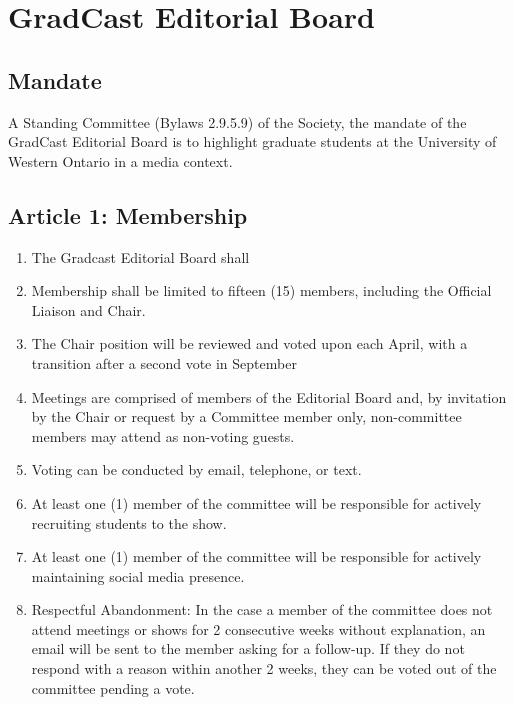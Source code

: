 \section{GradCast Editorial Board}

\subsection{Mandate}
A Standing Committee (Bylaws 2.9.5.9) of the Society, the mandate of the GradCast Editorial Board is to highlight graduate students at the University of Western Ontario in a media context.
\subsection{Article 1: Membership}
\begin{enumerate}
\item The Gradcast Editorial Board shall 
\item Membership shall be limited to fifteen (15) members, including the Official Liaison and Chair.
\item The Chair position will be reviewed and voted upon each April, with a transition after a second vote in September
\item Meetings are comprised of members of the Editorial Board and, by invitation by the Chair or request by a Committee member only, non-committee members may attend as non-voting guests.
\item Voting can be conducted by email, telephone, or text.
\item At least one (1) member of the committee will be responsible for actively recruiting students to the show.
\item At least one (1) member of the committee will be responsible for actively maintaining social media presence. 
\item Respectful Abandonment: In the case a member of the committee does not attend meetings or shows for 2 consecutive weeks without explanation, an email will be sent to the member asking for a follow-up. If they do not respond with a reason within another 2 weeks, they can be voted out of the committee pending a vote.
\end{enumerate}
